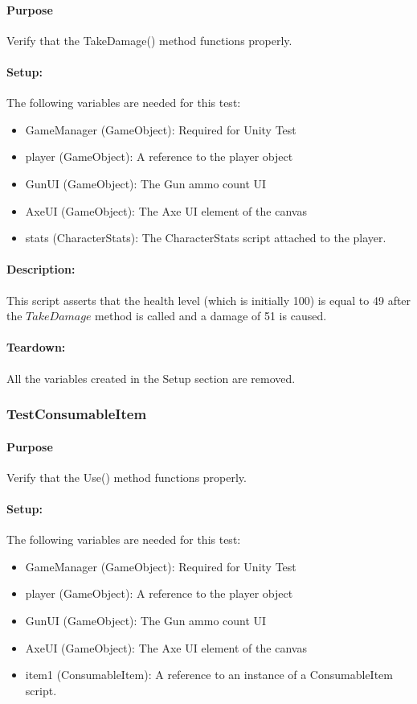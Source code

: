 \documentclass[12pt, titlepage]{article}
\begin{document}
{\paragraph{Purpose} Verify that the TakeDamage() method functions properly.

\paragraph{Setup: } The following variables are needed for this test:
\begin{itemize}
	\item GameManager (GameObject): Required for Unity Test
	\item  player (GameObject): A reference to the player object
	\item  GunUI (GameObject): The Gun ammo count UI
	\item AxeUI (GameObject): The Axe UI element of the canvas
	\item stats (CharacterStats): The CharacterStats script attached to the player.

\end{itemize}
\paragraph{Description: }
This script asserts that the health level (which is initially 100) is equal to 49 after the $TakeDamage$ method is called and a damage of 51 is caused.
\paragraph{Teardown: } All the variables created in the Setup section are removed.
\subsubsection{Test\textunderscore ConsumableItem}

\paragraph{Purpose} Verify that the Use() method functions properly.

\paragraph{Setup: } The following variables are needed for this test:
\begin{itemize}
	\item GameManager (GameObject): Required for Unity Test
	\item  player (GameObject): A reference to the player object
	\item  GunUI (GameObject): The Gun ammo count UI
	\item AxeUI (GameObject): The Axe UI element of the canvas
	\item item1 (ConsumableItem): A reference to an instance of a ConsumableItem script.
	

\end{itemize}}
\end{document}
